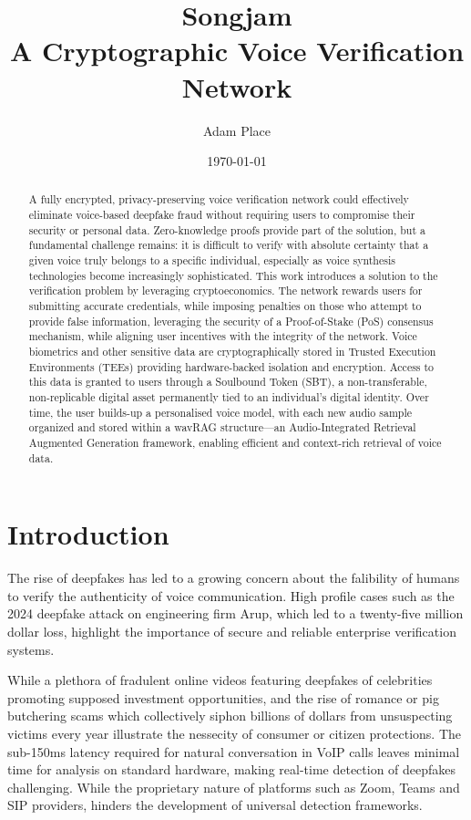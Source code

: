 \documentclass[11pt,a4paper]{article}
\title{Songjam\\[0.5em]\large A Cryptographic Voice Verification Network}
\author{Adam Place}
\date{\today}
\begin{document}
\maketitle

\begin{abstract}
A fully encrypted, privacy-preserving voice verification network could effectively eliminate voice-based deepfake fraud without requiring users to compromise their security or personal data.
Zero-knowledge proofs provide part of the solution, but a fundamental challenge remains: it is difficult to verify with absolute certainty that a given voice truly belongs to a specific individual, especially as voice synthesis technologies become increasingly sophisticated.
This work introduces a solution to the verification problem by leveraging cryptoeconomics.
The network rewards users for submitting accurate credentials, while imposing penalties on those who attempt to provide false information, leveraging the security of a Proof-of-Stake (PoS) consensus mechanism, while aligning user incentives with the integrity of the network.
Voice biometrics and other sensitive data are cryptographically stored in Trusted Execution Environments (TEEs) providing hardware-backed isolation and encryption.
Access to this data is granted to users through a Soulbound Token (SBT), a non-transferable, non-replicable digital asset permanently tied to an individual's digital identity.
Over time, the user builds-up a personalised voice model, with each new audio sample organized and stored within a wavRAG structure—an Audio-Integrated Retrieval Augmented Generation framework, enabling efficient and context-rich retrieval of voice data.
\end{abstract}

\section{Introduction}
\label{sec:introduction}
The rise of deepfakes has led to a growing concern about the falibility of humans to verify the authenticity of voice communication.
High profile cases such as the 2024 deepfake attack on engineering firm Arup, which led to a twenty-five million dollar loss, highlight the importance of secure and reliable enterprise verification systems.

While a plethora of fradulent online videos featuring deepfakes of celebrities promoting supposed investment opportunities, and the rise of romance or \textquotesingle pig butchering\textquotesingle{} scams which collectively siphon billions of dollars from unsuspecting victims every year illustrate the nessecity of consumer or citizen protections.
The sub-150ms latency required for natural conversation in VoIP calls leaves minimal time for analysis on standard hardware, making real-time detection of deepfakes challenging. While the proprietary nature of platforms such as Zoom, Teams and SIP providers, hinders the development of universal detection frameworks.
\end{document}
